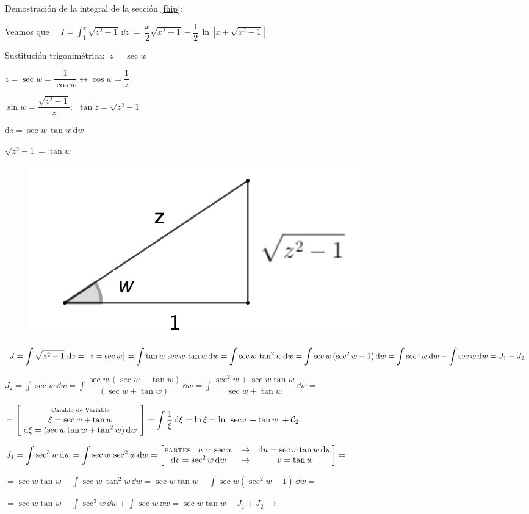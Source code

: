 Demostración de la integral de la sección \ref{fhip}:

Veamos que $\quad \displaystyle I=\int_1^x \sqrt{z^2-1}\, \dd z\ = \ \dfrac x 2 \sqrt{x^2-1}-\dfrac 1 2 \, \ln \, |x+\sqrt {x^2-1}|$

Sustitución trigonimétrica: $\ z=\sec w$

\begin{multicols}{2}
$z=\sec w=\dfrac 1{\cos w} \leftrightarrow \cos w=\dfrac 1 z$

$\sin w=\dfrac{\sqrt{z^2-1}}{z};\ \ \tan z=\sqrt{z^2-1}$

$\mathrm{d}z=\sec w\, \tan w\, \mathrm{d}w$

$\sqrt{z^2-1}=\tan w$
\begin{figure}[H]
	\centering
	\includegraphics[width=.35\textwidth]{img-hiperbol/hiperbol03.png}
	\end{figure}	
\end{multicols}
$J=\displaystyle \int \sqrt{z^2-1}\ \dd z = \mqty[z=\sec w] = \int \tan w\, \sec w\, \tan w\, \dd w= \int \sec w \, \tan^2 w\, \dd w =	\int \sec w\,(\sec^2 w-1) \,\dd w = \int \sec^3 w \, \dd w - \int \sec w \, \dd w=J_1-J_2$

$J_2=\displaystyle \int \sec w \, \dd w=\int \dfrac{\sec w \, (\sec w+\tan w)}{(\sec w+\tan w)}\, \dd w= \int \dfrac{\sec^2 w+\sec w \tan w}{\sec w + \tan w}\,\dd w=$

$=\mqty[ \text{\scriptsize{Cambio de Variable}} \\  \xi=\sec w+\tan w \\ \ \dd \xi=(\sec w  \tan w + \tan^2 w)\,\dd w \ ]=\displaystyle \int \dfrac 1 \xi \, \dd \xi = \ln \xi= \ln |\sec x + \tan w| + \mathcal C_2$

$J_1=\displaystyle \int \sec^3 w \, \dd w= \int \sec w \, \sec^2 w \, \dd w=\mqty[ \text{\scriptsize{PARTES: }}\ u=\sec w & \to & \dd u=\sec w \tan w \, \dd w \\ \dd v= \sec^2 w \, \dd w & \to & v=\tan w ]=$

$=\displaystyle \sec w \tan w - \displaystyle \int \sec w \, \tan^2 w \, \dd w =\sec w \tan w - \int \sec w (\sec^2 w - 1) \, \dd w =$

$=\displaystyle \sec w \tan w - \int \sec^3 w \, \dd w +\int \sec w \, \dd w = \sec w \tan w - J_1+J_2 \ \to $

